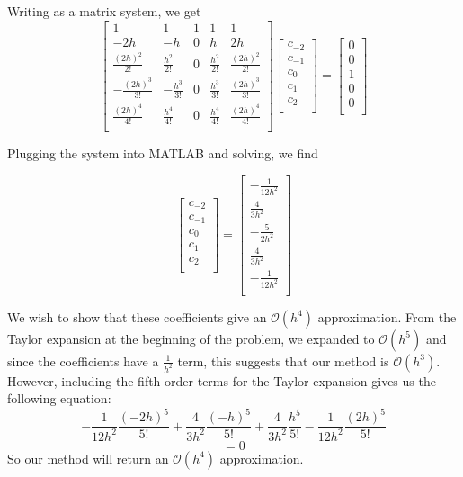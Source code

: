 \documentclass{article}
\begin{document}
Writing as a matrix system, we get 
\[
\begin{bmatrix}
    1 & 1 & 1 & 1 & 1\\
    -2h & -h & 0 & h & 2h\\
    \frac{(2h)^2}{2!} & \frac{h^2}{2!} & 0 & \frac{h^2}{2!} & \frac{(2h)^2}{2!}\\
    -\frac{(2h)^3}{3!} & -\frac{h^3}{3!} & 0 & \frac{h^3}{3!} & \frac{(2h)^3}{3!}\\
    \frac{(2h)^4}{4!} & \frac{h^4}{4!} & 0 & \frac{h^4}{4!} & \frac{(2h)^4}{4!}\\

\end{bmatrix}
\begin{bmatrix}
    c_{-2}\\
    c_{-1}\\
    c_{0}\\
    c_1\\
    c_2\\
\end{bmatrix}
 = 
 \begin{bmatrix}
    0\\
    0\\
    1\\
    0\\
    0\\
 \end{bmatrix}
\]

Plugging the system into MATLAB and solving, we find

\[
\begin{bmatrix}
    c_{-2}\\
    c_{-1}\\
    c_0\\
    c_1\\
    c_2\\
\end{bmatrix}
=
\begin{bmatrix}
    -\frac{1}{12h^2}\\
    \frac{4}{3h^2}\\
    -\frac{5}{2h^2}\\
    \frac{4}{3h^2}\\
    -\frac{1}{12h^2}\\
\end{bmatrix}
\]

We wish to show that these coefficients give an $\mathcal{O}(h^4)$ approximation. From the Taylor expansion at the beginning of the problem, we expanded to $\mathcal{O}(h^5)$ and since the coefficients have a $\frac{1}{h^2}$ term, this suggests that our method is $\mathcal{O}(h^3)$. However, including the fifth order terms for the Taylor expansion gives us the following equation:
\[-\frac{1}{12h^2}\frac{(-2h)^5}{5!} + \frac{4}{3h^2}\frac{(-h)^5}{5!} + \frac{4}{3h^2}\frac{h^5}{5!} - \frac{1}{12h^2}\frac{(2h)^5}{5!}\]
\[ = 0\]
So our method will return an $\mathcal{O}(h^4)$ approximation.
\end{document}
